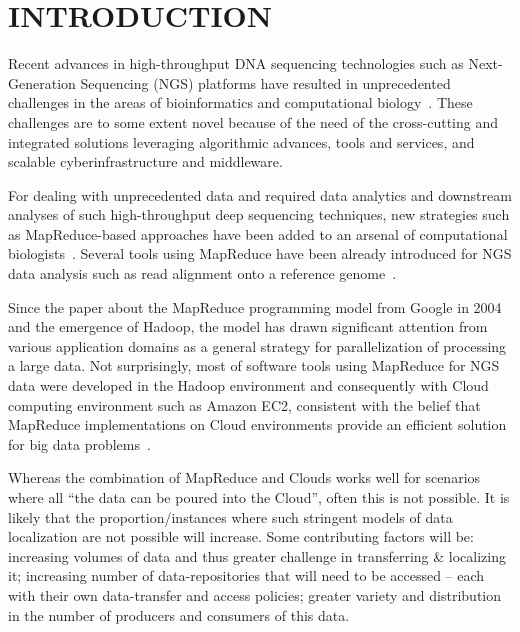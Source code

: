 \documentclass{acm_proc_article-sp}
\begin{document}
\section{INTRODUCTION} 

Recent advances in high-throughput DNA sequencing technologies such as
Next-Generation Sequencing (NGS) platforms have resulted in
unprecedented challenges in the areas of bioinformatics and
computational
biology~\cite{metzker2010,1000genome,wang2009-natrevgen,alex2009,mcpherson2009}.
These challenges are to some extent novel because of the need of the
cross-cutting and integrated solutions leveraging algorithmic
advances, tools and services, and scalable cyberinfrastructure and
middleware.



For dealing with unprecedented data and required data analytics and downstream analyses
of such high-throughput deep sequencing techniques, new strategies such as MapReduce-based
approaches have been added to an arsenal of computational biologists~\cite{schatz-nature-biotech-2010}.  Several tools using MapReduce have been already introduced for NGS data analysis such as read alignment onto a reference genome~\cite{cloudburst,
  gatk,langmead2009,seal2011,langmead2010, taylor2010}.

Since the paper about the MapReduce programming model from Google in
2004~\cite{mapreduce-2004-dean} and the emergence of Hadoop, the model
has drawn significant attention from various application domains as a
general strategy for parallelization of processing a large data.  Not
surprisingly, most of software tools using MapReduce for NGS data were
developed in the Hadoop environment and consequently with Cloud
computing environment such as Amazon EC2, consistent with the belief
that MapReduce implementations on Cloud environments provide an
efficient solution for big data
problems~\cite{mapreduce-2004-dean,schatz-nature-biotech-2010,
  taylor2010}.

Whereas the combination of MapReduce and Clouds works well for
scenarios where all ``the data can be poured into the Cloud'', often
this is not possible.  It is likely that the proportion/instances
where such stringent models of data localization are not possible will
increase.  Some contributing factors will be: increasing volumes of
data and thus greater challenge in transferring \& localizing it;
increasing number of data-repositories that will need to be accessed
-- each with their own data-transfer and access policies; greater
variety and distribution in the number of producers and consumers of
this data.
\end{document}
